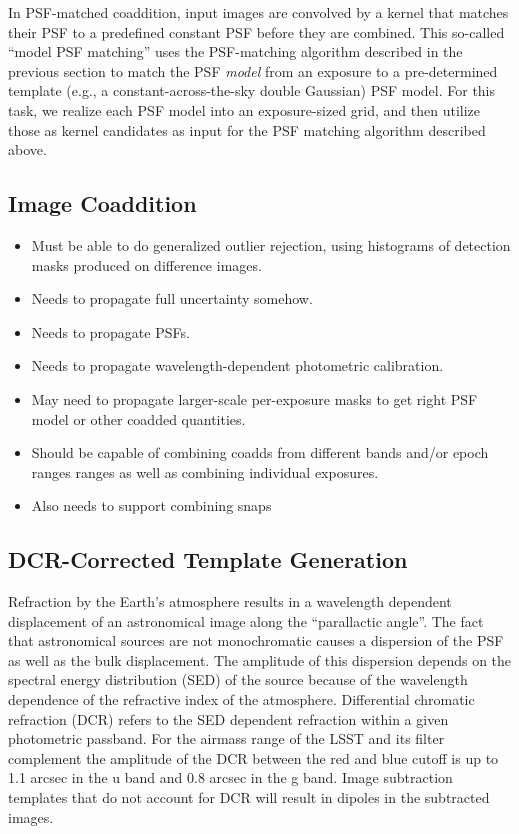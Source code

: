 In PSF-matched coaddition, input images are convolved by a kernel that matches their PSF to a predefined constant PSF before they are combined. This so-called ``model PSF matching'' uses the PSF-matching algorithm described in the previous section to match the PSF \emph{  model} from an exposure to a pre-determined template (e.g., a constant-across-the-sky double Gaussian) PSF model. For this task, we realize each PSF model into an exposure-sized grid, and then utilize those as kernel candidates as input for the PSF matching algorithm described above.

\subsection{Image Coaddition}
\label{sec:acCoaddition}
\begin{itemize}
\item Must be able to do generalized outlier rejection, using histograms of detection masks produced on difference images.
\item Needs to propagate full uncertainty somehow.
\item Needs to propagate PSFs.
\item Needs to propagate wavelength-dependent photometric calibration.
\item May need to propagate larger-scale per-exposure masks to get right PSF model or other coadded quantities.
\item Should be capable of combining coadds from different bands and/or epoch ranges ranges as well as combining individual exposures.
\item Also needs to support combining snaps
\end{itemize}

\subsection{DCR-Corrected Template Generation}
\label{sec:acDCRTemplates}

Refraction by the Earth's atmosphere results in a wavelength dependent
displacement of an
astronomical image along the ``parallactic angle''. The fact that astronomical
sources are not monochromatic causes a dispersion of the PSF as well
as the bulk displacement.  The amplitude of
this dispersion depends on the spectral energy distribution (SED) of
the source because of the wavelength dependence of the refractive index 
of the atmosphere. Differential
chromatic refraction (DCR) refers to the SED dependent refraction
within a given photometric passband. For the airmass range of the LSST
and its filter complement the amplitude of the DCR between the
red and blue cutoff is up to 1.1
arcsec in the u band and 0.8 arcsec in the g band. Image subtraction
templates that do not account for DCR will result in dipoles in the
subtracted images.

